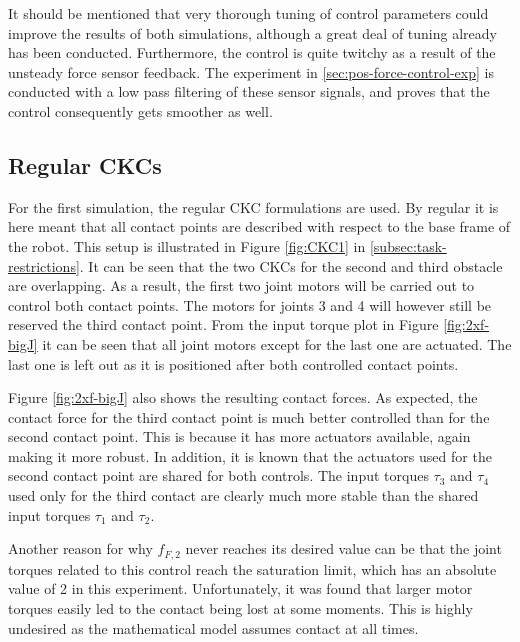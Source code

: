 It should be mentioned that very thorough tuning of control parameters could improve the results of both simulations, although a great deal of tuning already has been conducted. Furthermore, the control is quite twitchy as a result of the unsteady force sensor feedback. The experiment in \ref{sec:pos-force-control-exp} is conducted with a low pass filtering of these sensor signals, and proves that the control consequently gets smoother as well.

\subsection{Regular CKCs}

For the first simulation, the regular CKC formulations are used. By regular it is here meant that all contact points are described with respect to the base frame of the robot. This setup is illustrated in Figure \ref{fig:CKC1} in \ref{subsec:task-restrictions}. It can be seen that the two CKCs for the second and third obstacle are overlapping. As a result, the first two joint motors will be carried out to control both contact points. The motors for joints 3 and 4 will however still be reserved the third contact point. From the input torque plot in Figure \ref{fig:2xf-bigJ} it can be seen that all joint motors except for the last one are actuated. The last one is left out as it is positioned after both controlled contact points. 

Figure \ref{fig:2xf-bigJ} also shows the resulting contact forces. As expected, the contact force for the third contact point is much better controlled than for the second contact point. This is because it has more actuators available, again making it more robust. In addition, it is known that the actuators used for the second contact point are shared for both controls. The input torques $\tau_3$ and $\tau_4$ used only for the third contact are clearly much more stable than the shared input torques $\tau_1$ and $\tau_2$.

Another reason for why $f_{F,2}$ never reaches its desired value can be that the joint torques related to this control reach the saturation limit, which has an absolute value of 2 in this experiment. Unfortunately, it was found that larger motor torques easily led to the contact being lost at some moments. This is highly undesired as the mathematical model assumes contact at all times.

